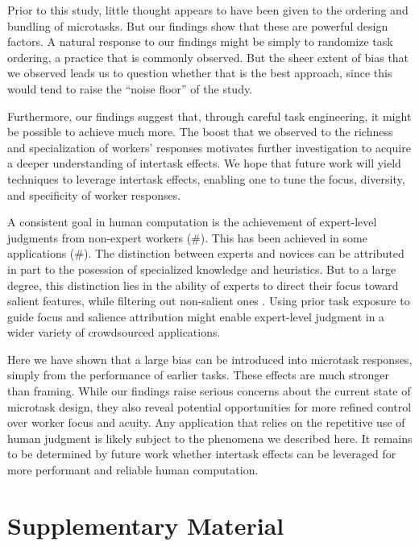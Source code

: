 \documentclass[12pt]{article}
\begin{document}
Prior to this study, little thought appears to have been given to the 
ordering and bundling of microtasks.  But our findings show that these are 
powerful design factors.  A natural response to our findings 
might be simply to randomize task ordering, a practice that is commonly 
observed.  But the sheer extent of bias that we observed leads us to question 
whether that is the best approach, since this would tend to raise 
the ``noise floor'' of the study.

Furthermore, our findings suggest that, through careful task engineering,
it might be possible to achieve much more.  The boost that we observed to the 
richness and specialization of workers' responses motivates further 
investigation to acquire a deeper understanding of intertask effects.  
We hope that future work will yield techniques to leverage intertask effects, 
enabling one to tune the focus, diversity, and specificity of worker 
responses.

A consistent goal in human computation is the achievement of expert-level
judgments from non-expert workers (\#).  This has been achieved in some
applications (\#). The distinction between experts and novices can be 
attributed in part to the posession of specialized knowledge and heuristics. 
But to a large degree, this distinction lies in the ability of 
experts to direct their focus toward salient features, while filtering out 
non-salient ones \cite{kellman2009perceptual}.  Using prior task exposure to 
guide focus and salience attribution might enable expert-level 
judgment in a wider variety of crowdsourced applications.

Here we have shown that a large bias can be introduced into microtask 
responses, simply from the performance of earlier tasks. 
These effects are much stronger than framing.  
While our findings raise serious concerns about the 
current state of microtask design, they also reveal potential opportunities 
for more 
refined control over worker focus and acuity.  Any application that relies
on the repetitive use of human judgment is likely subject to the phenomena
we described here.  It remains to be determined by future work whether 
intertask effects can be leveraged for more performant and reliable human 
computation.





\section*{Supplementary Material}
\end{document}
